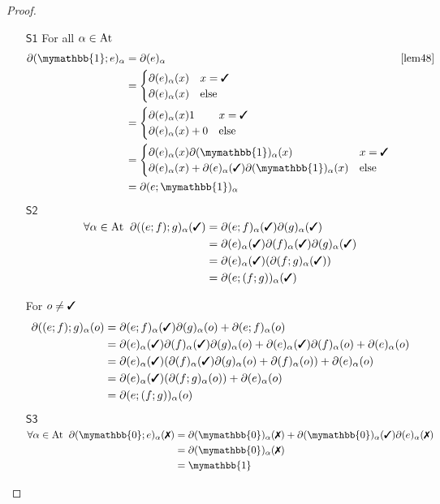 \documentclass[a4paper,UKenglish,cleveref, autoref, thm-restate]{lipics-v2021}
\newcommand{\cmark}{\text{\ding{51}}}
\newcommand{\xmark}{\text{\ding{55}}}
\newcommand{\At}{\text{\upshape{At}}}
\newcommand{\Ax}[1]{\ensuremath{\mathsf{#1}}}
\newcommand{\bskip}{\mymathbb{1}}
\newcommand{\babort}{\mymathbb{0}}
\theoremstyle{plain}\newtheoremrep{thm}{Theorem}[section]
\begin{document}
\begin{toappendix}
\begin{proof}
\begin{enumerate}
				\item[\Ax{S1}]
				For all $\alpha \in \At$
				\begin{align*}
					\partial(\bskip;e)_\alpha &= \partial(e)_\alpha & \cref{lem48}\\ 
					&= \begin{cases}
						\partial(e)_\alpha(x) & x=\cmark \\
						\partial(e)_\alpha(x) & \text{else}
					\end{cases}\\
					&= \begin{cases}
						\partial(e)_\alpha(x)1 & x=\cmark \\
						\partial(e)_\alpha(x)+0 & \text{else}
					\end{cases}\\
					&= \begin{cases}
						\partial(e)_\alpha(x)\partial(\bskip)_\alpha(x) & x=\cmark \\
						\partial(e)_\alpha(x)+\partial(e)_\alpha(\cmark)\partial(\bskip)_\alpha(x) & \text{else}
					\end{cases}\\
					&= \partial(e;\bskip)_\alpha
				\end{align*}
				\item[\Ax{S2}]
				\begin{align*}
					\forall \alpha \in \At\;\;\partial((e;f);g)_\alpha(\cmark) &= \partial(e;f)_\alpha(\cmark)\partial(g)_\alpha(\cmark)\\
					&= \partial(e)_\alpha(\cmark)\partial(f)_\alpha(\cmark)\partial(g)_\alpha(\cmark)\\
					&= \partial(e)_\alpha(\cmark)(\partial(f;g)_\alpha(\cmark))\\
					&= \partial(e;(f;g))_\alpha(\cmark)
				\end{align*}
				
				For $o \neq \cmark$
				\begin{align*}	
					\partial((e;f);g)_\alpha(o) &= \partial(e;f)_\alpha(\cmark)\partial(g)_\alpha(o) + \partial(e;f)_\alpha(o)\\
					&= \partial(e)_\alpha(\cmark)\partial(f)_\alpha(\cmark)\partial(g)_\alpha(o)  + \partial(e)_\alpha(\cmark)\partial(f)_\alpha(o)+\partial(e)_\alpha(o)\\
					&= \partial(e)_\alpha(\cmark)(\partial(f)_\alpha(\cmark)\partial(g)_\alpha(o)  + \partial(f)_\alpha(o))+\partial(e)_\alpha(o)\\
					&= \partial(e)_\alpha(\cmark)(\partial(f;g)_\alpha(o))+\partial(e)_\alpha(o)\\
					&= \partial(e;(f;g))_\alpha(o)
				\end{align*}
				\item[\Ax{S3}]
				\begin{align*}
					\forall \alpha \in \At\;\;\partial(\babort;e)_\alpha(\xmark) &= \partial(\babort)_\alpha(\xmark) + \partial(\babort)_\alpha(\cmark)\partial(e)_\alpha(\xmark)\\
					&= \partial(\babort)_\alpha(\xmark)\\
					&= \bskip
				\end{align*}
				

\end{enumerate}
\end{proof}
\end{toappendix}
\end{document}
